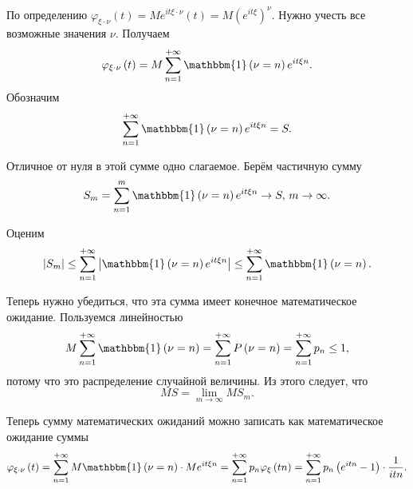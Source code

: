 По определению $ \varphi_{ \xi \cdot \nu } \left( t \right) = Me^{it \xi \cdot \nu } \left( t \right) = M \left( e^{it \xi} \right)^{ \nu }.$
Нужно учесть все возможные значения $ \nu $.
Получаем
$$ \varphi_{ \xi \cdot \nu } \left( t \right) =
M \sum \limits_{n = 1}^{+ \infty } \mathbbm{1} \left( \nu = n \right) e^{it \xi n}.$$
Обозначим
$$ \sum \limits_{n = 1}^{+ \infty } \mathbbm{1} \left( \nu = n \right) e^{it \xi n} =
S.$$

Отличное от нуля в этой сумме одно слагаемое.
Берём частичную сумму
$$S_m =
\sum \limits_{n = 1}^{m} \mathbbm{1} \left( \nu = n \right) e^{it \xi n} \rightarrow S, \,
m \rightarrow \infty.$$

Оценим
$$ \left| S_m \right| \leq
\sum \limits_{n = 1}^{+ \infty } \left| \mathbbm{1} \left( \nu = n \right) e^{it \xi n} \right| \leq
\sum \limits_{n = 1}^{+ \infty } \mathbbm{1} \left( \nu = n \right).$$

Теперь нужно убедиться, что эта сумма имеет конечное математическое ожидание.
Пользуемся линейностью
$$M \sum \limits_{n = 1}^{+ \infty } \mathbbm{1} \left( \nu = n \right) =
\sum \limits_{n = 1}^{+ \infty } P \left( \nu = n \right) =
\sum \limits_{n = 1}^{+ \infty } p_n \leq
1,$$
потому что это распределение случайной величины.
Из этого следует, что
$$MS =
\lim \limits_{m \to \infty } MS_m.$$

Теперь сумму математических ожиданий можно записать как математическое ожидание суммы
$$ \varphi_{ \xi \cdot \nu } \left( t \right) =
\sum \limits_{n = 1}^{+ \infty } M \mathbbm{1} \left( \nu = n \right) \cdot Me^{it \xi n} =
\sum \limits_{n = 1}^{+ \infty } p_n \varphi_{ \xi } \left( tn \right) =
\sum \limits_{n = 1}^{+ \infty } p_n \left( e^{itn} - 1 \right) \cdot \frac{1}{itn}.$$
